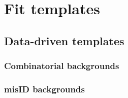 \section{Fit templates}

\subsection{Data-driven templates}
\label{ref:fit:tmpl:data-driven}


\subsubsection{Combinatorial backgrounds}
\label{ref:fit:tmpl:data-driven:comb}


\subsubsection{misID backgrounds}
\label{ref:fit:tmpl:data-driven:misid}
